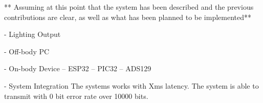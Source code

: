 ** Assuming at this point that the system has been described and the previous contributions are clear, as well as what has been planned to be implemented**

- Lighting Output

- Off-body PC

- On-body Device
    -- ESP32
    -- PIC32
    -- ADS129

- System Integration
The systems works with Xms latency.
The system is able to transmit with 0 bit error rate over 10000 bits.
